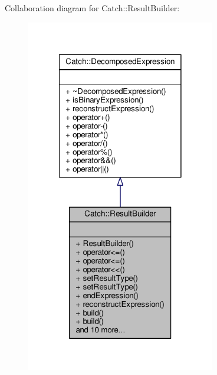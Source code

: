 Collaboration diagram for Catch\-:\-:Result\-Builder\-:
\nopagebreak
\begin{figure}[H]
\begin{center}
\leavevmode
\includegraphics[width=234pt]{class_catch_1_1_result_builder__coll__graph}
\end{center}
\end{figure}
